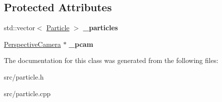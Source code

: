\subsection*{Protected Attributes}
\begin{DoxyCompactItemize}
\item 
\hypertarget{class_particle_system_a5c5e894d64b153f888e59bd888df6346}{}std\+::vector$<$ \hyperlink{class_particle}{Particle} $>$ {\bfseries \+\_\+particles}\label{class_particle_system_a5c5e894d64b153f888e59bd888df6346}

\item 
\hypertarget{class_particle_system_a6c6c5a7616e412278a798d912d0402b4}{}\hyperlink{class_perspective_camera}{Perspective\+Camera} $\ast$ {\bfseries \+\_\+pcam}\label{class_particle_system_a6c6c5a7616e412278a798d912d0402b4}

\end{DoxyCompactItemize}


The documentation for this class was generated from the following files\+:\begin{DoxyCompactItemize}
\item 
src/particle.\+h\item 
src/particle.\+cpp\end{DoxyCompactItemize}
